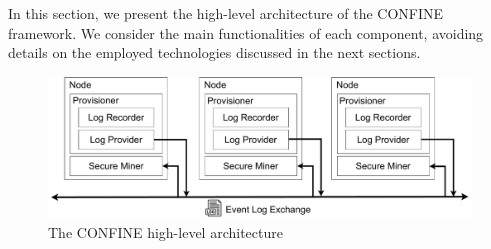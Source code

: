 
In this section, we present the high-level architecture of the CONFINE framework. We consider the main functionalities of each component, avoiding details on the employed technologies discussed in the next sections. %
\begin{figure}[t]
	\centering
	\includegraphics[width=1\linewidth]{content/figures/architecturediagram.pdf}
	\caption{The CONFINE high-level architecture}
	\label{fig:architecture_diagram}
\end{figure}


